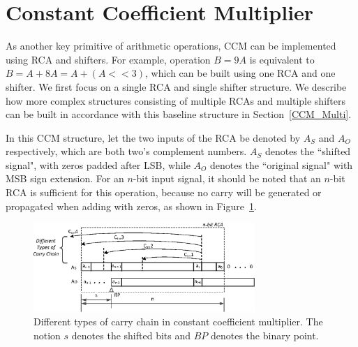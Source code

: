 \documentclass[journal]{IEEEtran}
\begin{document}

\section{Constant Coefficient Multiplier}\label{section_CCM}

As another key primitive of arithmetic operations, CCM can be implemented using RCA and shifters. For example, operation $B=9A$ is equivalent to $B=A+8A=A+(A<<3)$, which can be built using one RCA and one shifter. We first focus on a single RCA and single shifter structure. We describe how more complex structures consisting of multiple RCAs and multiple shifters can be built in accordance with this baseline structure in Section~\ref{CCM_Multi}.

In this CCM structure, let the two inputs of the RCA be denoted by $A_S$ and $A_O$ respectively, which are both two's complement numbers. $A_S$ denotes the ``shifted signal", with zeros padded after LSB, while $A_O$ denotes the ``original signal" with MSB sign extension. For an $n$-bit input signal, it should be noted that an $n$-bit RCA is sufficient for this operation, because no carry will be generated or propagated when adding with zeros, as shown in Figure~\ref{CCM_fig}.
\begin{figure}[htbp]
  \centering
  \includegraphics[width=3.3in]{./Figures/CCM_DataFlow3.eps}
  \caption{Different types of carry chain in constant coefficient multiplier. The notion $s$ denotes the shifted bits and $BP$ denotes the binary point.}
  \label{CCM_fig}
\end{figure}
\end{document}
